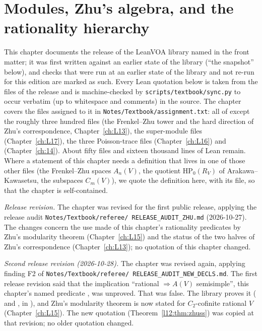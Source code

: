 \chapter{Modules, Zhu's algebra, and the rationality hierarchy}\label{ch:L12}
\begingroup\setlength{\emergencystretch}{3em}

\providecommand{\ltwelvevac}{\mathbf{1}}
\providecommand{\ltwelveY}{\mathcal{Y}}
\providecommand{\ltwelveO}{O}
\providecommand{\ltwelveA}{A}
\providecommand{\ltwelvecirc}{\circ}
\providecommand{\ltwelveHP}{\mathrm{HP}_0}

This chapter documents the release of the LeanVOA library named in the front matter; it was first written against an earlier state of the library (``the snapshot'' below), and checks that were
run at an earlier state of the library and not re-run for this edition are marked as such. Every Lean quotation below is taken from the files of the release and is
machine-checked by \texttt{scripts/textbook/sync.py} to occur verbatim (up to whitespace and
comments) in the source. The chapter covers the files assigned to it in
\texttt{Notes/Textbook/assignment.txt}: all of  except the
roughly three hundred files  (the Frenkel--Zhu
tower and the hard direction of Zhu's correspondence, Chapter~\ref{ch:L13}), the super-module files
 (Chapter~\ref{ch:L17}), the three Poisson-trace files
(Chapter~\ref{ch:L16}) and  (Chapter~\ref{ch:14}). About fifty files
and sixteen thousand lines of Lean remain. Where a statement of this chapter needs a definition
that lives in one of those other files (the Frenkel--Zhu spaces $A_n(V)$, the quotient
$\ltwelveHP(R_V)$ of Arakawa--Kawasetsu, the subspaces $C_m(V)$), we quote the definition here, with
its file, so that the chapter is self-contained.

\emph{Release revision.} The chapter was revised for the first public release, applying the release audit \texttt{Notes/\allowbreak Textbook/\allowbreak referee/\allowbreak
RELEASE\_AUDIT\_ZHU.md} (2026-10-27). The changes concern the use made of this chapter's rationality predicates by Zhu's
modularity theorem (Chapter~\ref{ch:L15}) and the status of the two halves of Zhu's correspondence (Chapter~\ref{ch:L13}); no
quotation of this chapter changed.

\emph{Second release revision (2026-10-28).} The chapter was revised again, applying finding F2 of \texttt{Notes/\allowbreak Textbook/\allowbreak referee/\allowbreak
RELEASE\_AUDIT\_NEW\_DECLS.md}. The first release revision said that the implication ``rational $\Rightarrow A(V)$
semisimple'', this chapter's named predicate , was unproved. That was false. The library proves
it (\allowbreak{}\allowbreak{} and ,
in ), and Zhu's modularity theorem is now stated for
$C_2$-cofinite rational $V$ (Chapter~\ref{ch:L15}). The new quotation (Theorem~\ref{l12:thm:zhuss}) was copied at
that revision; no older quotation changed.

